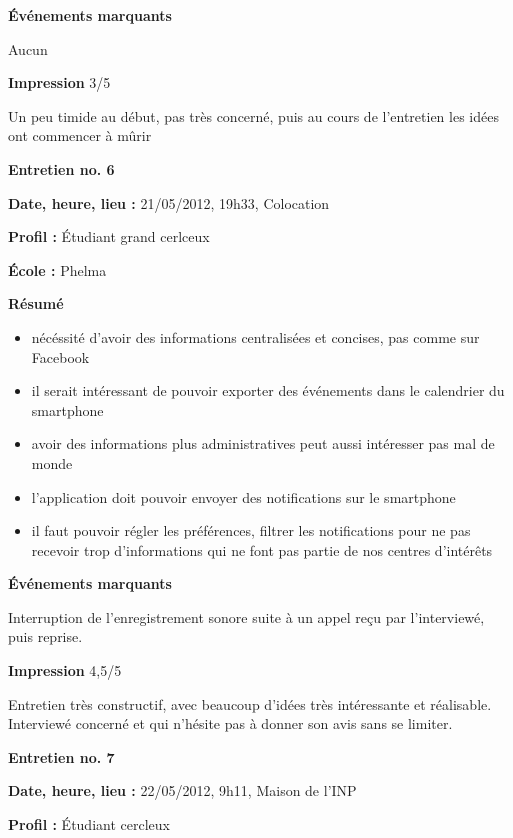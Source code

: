 \documentclass[a4paper, 11px]{article}
\begin{document}
\textbf{Événements marquants}

Aucun

\textbf{Impression} 3/5

Un peu timide au début, pas très concerné, puis au cours de l'entretien les idées ont commencer à mûrir



\vspace{.3cm}

 \textbf {\large Entretien no. 6}

\textbf{Date, heure, lieu : }
21/05/2012, 19h33, Colocation

\textbf{Profil : }
Étudiant grand cerlceux


\textbf{École : }
Phelma

\textbf{Résumé}
	\begin{itemize}
		\item nécéssité d'avoir des informations centralisées et concises, pas comme sur Facebook
		\item il serait intéressant de pouvoir exporter des événements dans le calendrier du smartphone
		\item avoir des informations plus administratives peut aussi intéresser pas mal de monde
		\item l'application doit pouvoir envoyer des notifications sur le smartphone
		\item il faut pouvoir régler les préférences, filtrer les notifications pour ne pas recevoir trop d'informations qui ne font pas partie de nos centres d'intérêts
	\end{itemize}
\vspace{.25cm}


\textbf{Événements marquants}

Interruption de l'enregistrement sonore suite à un appel reçu par l'interviewé, puis reprise.

\textbf{Impression} 4,5/5

Entretien très constructif, avec beaucoup d'idées très intéressante et réalisable. Interviewé concerné et qui n'hésite pas à donner son avis sans se limiter.




\vspace{.3cm}

 \textbf {\large Entretien no. 7}

\textbf{Date, heure, lieu : }
22/05/2012, 9h11, Maison de l'INP

\textbf{Profil : }
Étudiant cercleux
\end{document}

